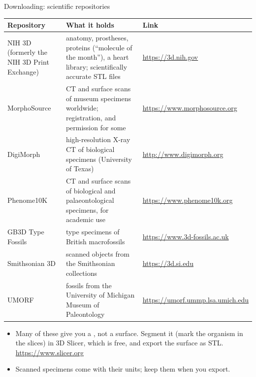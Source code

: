 \documentclass[aspectratio=169,11pt]{beamer}
\begin{document}
\begin{frame}{Downloading: scientific repositories}
\scriptsize
\begin{tabular}{@{}L{0.19\textwidth}L{0.4\textwidth}L{0.34\textwidth}@{}}
\toprule
Repository & What it holds & Link\\
\midrule
NIH 3D (formerly the NIH 3D Print Exchange) & anatomy, prostheses, proteins (``molecule of the month''), a heart library; scientifically accurate STL files & \url{https://3d.nih.gov}\\
MorphoSource & CT and surface scans of museum specimens worldwide; registration, and permission for some & \url{https://www.morphosource.org}\\
DigiMorph & high-resolution X-ray CT of biological specimens (University of Texas) & \url{http://www.digimorph.org}\\
Phenome10K & CT and surface scans of biological and palaeontological specimens, for academic use & \url{https://www.phenome10k.org}\\
GB3D Type Fossils & type specimens of British macrofossils & \url{https://www.3d-fossils.ac.uk}\\
Smithsonian 3D & scanned objects from the Smithsonian collections & \url{https://3d.si.edu}\\
UMORF & fossils from the University of Michigan Museum of Paleontology & \url{https://umorf.ummp.lsa.umich.edu}\\
\bottomrule
\end{tabular}
\vspace{2mm}
\begin{itemize}
  \item Many of these give you a , not a surface. Segment it (mark the organism in the slices) in 3D Slicer, which is free, and export the surface as STL. \url{https://www.slicer.org}
  \item Scanned specimens come with their units; keep them when you export.
\end{itemize}
\end{frame}
\end{document}
